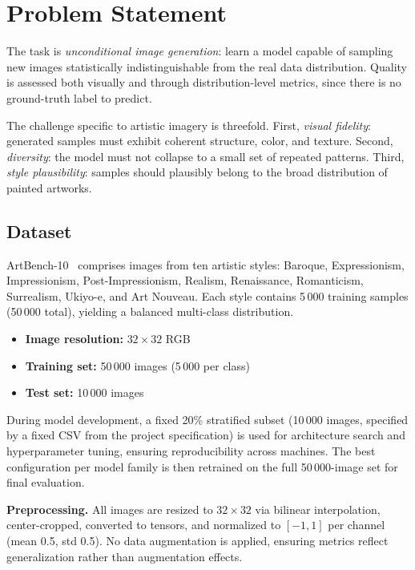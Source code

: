 \documentclass[runningheads]{llncs}
\begin{document}
\section{Problem Statement}\label{sec:problem}

The task is \emph{unconditional image generation}: learn a model capable of sampling new images statistically indistinguishable from the real data distribution. Quality is assessed both visually and through distribution-level metrics, since there is no ground-truth label to predict.

The challenge specific to artistic imagery is threefold. First, \emph{visual fidelity}: generated samples must exhibit coherent structure, color, and texture. Second, \emph{diversity}: the model must not collapse to a small set of repeated patterns. Third, \emph{style plausibility}: samples should plausibly belong to the broad distribution of painted artworks.

\subsection{Dataset}

ArtBench-10~\cite{liao2022} comprises images from ten artistic styles: Baroque, Expressionism, Impressionism, Post-Impressionism, Realism, Renaissance, Romanticism, Surrealism, Ukiyo-e, and Art Nouveau. Each style contains 5\,000 training samples (50\,000 total), yielding a balanced multi-class distribution.

\begin{itemize}
    \item \textbf{Image resolution:} $32 \times 32$ RGB
    \item \textbf{Training set:} 50\,000 images (5\,000 per class)
    \item \textbf{Test set:} 10\,000 images
\end{itemize}

During model development, a fixed 20\% stratified subset (10\,000 images, specified by a fixed CSV from the project specification) is used for architecture search and hyperparameter tuning, ensuring reproducibility across machines. The best configuration per model family is then retrained on the full 50\,000-image set for final evaluation.

\noindent\textbf{Preprocessing.} All images are resized to $32 \times 32$ via bilinear interpolation, center-cropped, converted to tensors, and normalized to $[-1, 1]$ per channel (mean 0.5, std 0.5). No data augmentation is applied, ensuring metrics reflect generalization rather than augmentation effects.
\end{document}
